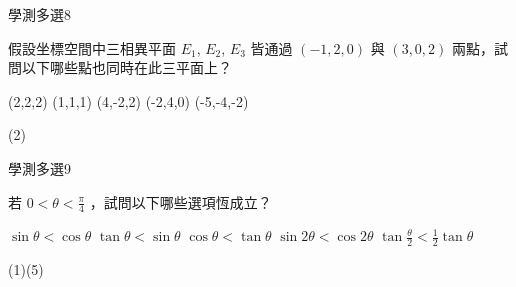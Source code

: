     \begin{QUESTION}
        \begin{ExamInfo}{94}{學測}{多選}{8}
        \end{ExamInfo}
        \begin{ExamAnsRateInfo}{34}{67}{22}{13}
        \end{ExamAnsRateInfo}
        \begin{QBODY}
            假設坐標空間中三相異平面 $E_1$, $E_2$, $E_3$ 皆通過 $(-1,2,0)$ 與 $(3,0,2)$ 兩點，試問以下哪些點也同時在此三平面上？ 
			\begin{QOPS} 
				\QOP (2,2,2) 
				\QOP (1,1,1) 
				\QOP (4,-2,2) 
				\QOP (-2,4,0) 
				\QOP (-5,-4,-2)
			\end{QOPS}
        \end{QBODY}
        \begin{QFROMS}
        \end{QFROMS}
        \begin{QTAGS}\end{QTAGS}
        \begin{QANS}
            (2)
        \end{QANS}
        \begin{QSOLLIST}
        \end{QSOLLIST}
        \begin{QEMPTYSPACE}
        \end{QEMPTYSPACE}
    \end{QUESTION}
    \begin{QUESTION}
        \begin{ExamInfo}{94}{學測}{多選}{9}
        \end{ExamInfo}
        \begin{ExamAnsRateInfo}{37}{69}{32}{10}
        \end{ExamAnsRateInfo}
        \begin{QBODY}
            若 $0 < \theta < \frac{\pi}{4}$ ，試問以下哪些選項恆成立？ 
			\begin{QOPS} 
				\QOP	$\sin \theta < \cos \theta$	
				\QOP	$\tan \theta < \sin \theta$ 
				\QOP $\cos \theta < \tan \theta$ 
				\QOP $\sin{2\theta} <\cos{2\theta}$ 
				\QOP $\tan{\frac{\theta}{2}} <\frac{1}{2} \tan \theta$
			\end{QOPS}
        \end{QBODY}
        \begin{QFROMS}
        \end{QFROMS}
        \begin{QTAGS}\end{QTAGS}
        \begin{QANS}
            (1)(5)
        \end{QANS}
        \begin{QSOLLIST}
        \end{QSOLLIST}
        \begin{QEMPTYSPACE}
        \end{QEMPTYSPACE}
    \end{QUESTION}
